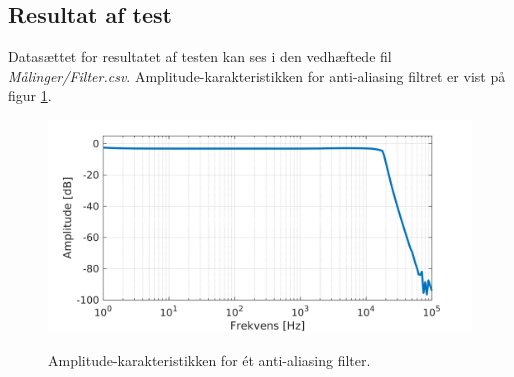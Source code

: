 \subsection{Resultat af test}
Datasættet for resultatet af testen kan ses i den vedhæftede fil \textit{Målinger/Filter.csv}. Amplitude-karakteristikken for anti-aliasing filtret er vist på figur \ref{fig:tf_filter}. 


\begin{figure}[h]
	\caption{Amplitude-karakteristikken for ét anti-aliasing filter.}
	\includegraphics[width=1\linewidth]{matlab/tf_AAfilter.png}
	\label{fig:tf_filter}
\end{figure}